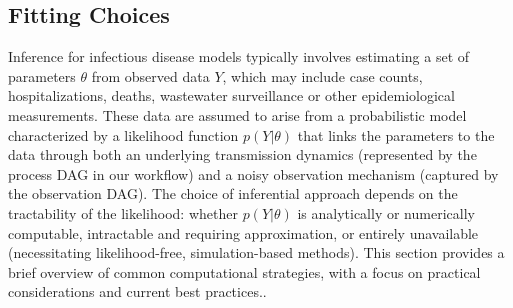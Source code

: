 \documentclass{article}
\begin{document}

\subsection{Fitting Choices}\label{sec:fitting}

Inference for infectious disease models typically involves estimating a set of parameters $\theta$ from observed data $Y$, which may include case counts, hospitalizations, deaths, wastewater surveillance or other epidemiological measurements. These data are assumed to arise from a probabilistic model characterized by a likelihood function $p(Y | \theta)$ that links the parameters to the data through both an underlying transmission dynamics (represented by the process DAG in our workflow) and a noisy observation mechanism (captured by the observation DAG).  The choice of inferential approach depends on the tractability of the likelihood: 
whether $ p(Y | \theta)$ is analytically or numerically computable, intractable and requiring approximation, or entirely  unavailable (necessitating likelihood-free, simulation-based methods). This section provides a brief overview of common computational strategies, with a focus on practical considerations and current best practices.. 
\end{document}
